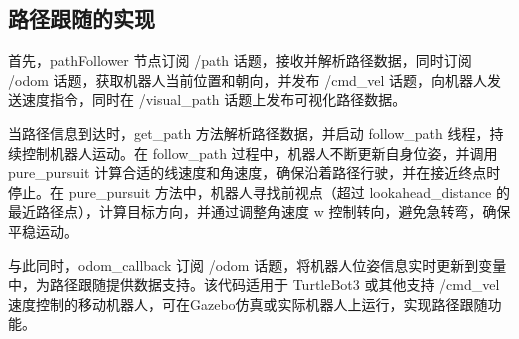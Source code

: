 \subsection{路径跟随的实现}
首先，pathFollower 节点订阅 /path 话题，接收并解析路径数据，同时订阅 /odom 话题，获取机器人当前位置和朝向，并发布 /cmd\_vel 话题，向机器人发送速度指令，同时在 /visual\_path 话题上发布可视化路径数据。

当路径信息到达时，get\_path 方法解析路径数据，并启动 follow\_path 线程，持续控制机器人运动。在 follow\_path 过程中，机器人不断更新自身位姿，并调用 pure\_pursuit 计算合适的线速度和角速度，确保沿着路径行驶，并在接近终点时停止。在 pure\_pursuit 方法中，机器人寻找前视点（超过 lookahead\_distance 的最近路径点），计算目标方向，并通过调整角速度 w 控制转向，避免急转弯，确保平稳运动。

与此同时，odom\_callback 订阅 /odom 话题，将机器人位姿信息实时更新到变量中，为路径跟随提供数据支持。该代码适用于 TurtleBot3 或其他支持 /cmd\_vel 速度控制的移动机器人，可在Gazebo仿真或实际机器人上运行，实现路径跟随功能。

